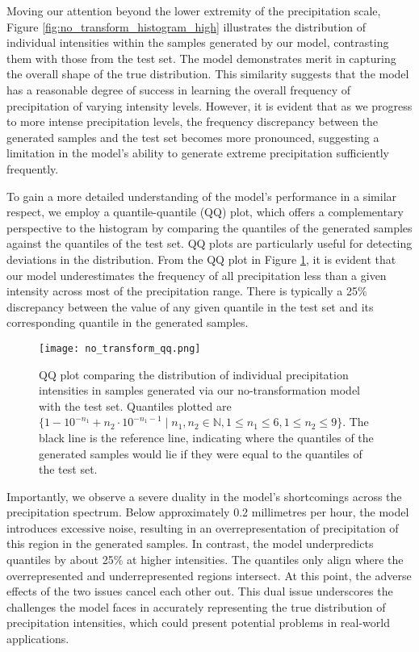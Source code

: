 \documentclass[ oneside,%
                    author={George Herbert},
                    degree={MSci},
                     title={Diffusion Models for Time-Evolving Precipitation Fields},
                  subtitle={}]{dissertation}
\begin{document}
Moving our attention beyond the lower extremity of the precipitation scale, Figure \ref{fig:no_transform_histogram_high} illustrates the distribution of individual intensities within the samples generated by our model, contrasting them with those from the test set. The model demonstrates merit in capturing the overall shape of the true distribution. This similarity suggests that the model has a reasonable degree of success in learning the overall frequency of precipitation of varying intensity levels. However, it is evident that as we progress to more intense precipitation levels, the frequency discrepancy between the generated samples and the test set becomes more pronounced, suggesting a limitation in the model's ability to generate extreme precipitation sufficiently frequently.

To gain a more detailed understanding of the model's performance in a similar respect, we employ a quantile-quantile (QQ) plot, which offers a complementary perspective to the histogram by comparing the quantiles of the generated samples against the quantiles of the test set. QQ plots are particularly useful for detecting deviations in the distribution. From the QQ plot in Figure \ref{fig:no_transform_qq}, it is evident that our model underestimates the frequency of all precipitation less than a given intensity across most of the precipitation range. There is typically a 25\% discrepancy between the value of any given quantile in the test set and its corresponding quantile in the generated samples.

\begin{figure}[htbp]
      \centering
      \texttt{[image: no\_transform\_qq.png]}
      \caption{QQ plot comparing the distribution of individual precipitation intensities in samples generated via our no-transformation model with the test set. Quantiles plotted are $\{1 - 10^{-n_1} + n_2 \cdot 10^{-n_1 - 1}\mid n_1,n_2\in \mathbb{N}, 1 \le n_1 \le 6, 1 \le n_2 \le 9\}$. The black line is the reference line, indicating where the quantiles of the generated samples would lie if they were equal to the quantiles of the test set.}
      \label{fig:no_transform_qq}
\end{figure}

Importantly, we observe a severe duality in the model's shortcomings across the precipitation spectrum. Below approximately 0.2 millimetres per hour, the model introduces excessive noise, resulting in an overrepresentation of precipitation of this region in the generated samples. In contrast, the model underpredicts quantiles by about 25\% at higher intensities. The quantiles only align where the overrepresented and underrepresented regions intersect. At this point, the adverse effects of the two issues cancel each other out. This dual issue underscores the challenges the model faces in accurately representing the true distribution of precipitation intensities, which could present potential problems in real-world applications.
\end{document}
